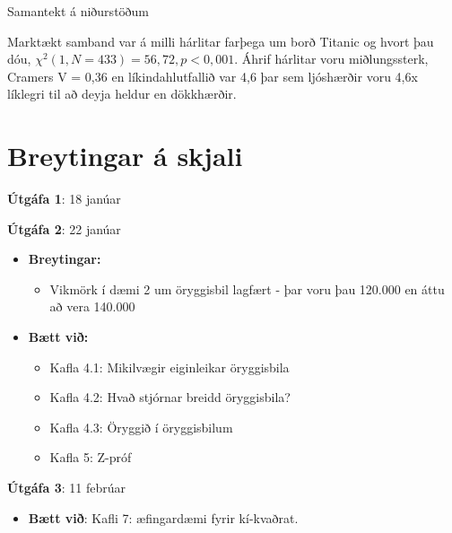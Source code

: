 \documentclass[
]{book}
\providecommand{\tightlist}{%
  \setlength{\itemsep}{0pt}\setlength{\parskip}{0pt}}
\begin{document}
Samantekt á niðurstöðum

Marktækt samband var á milli hárlitar farþega um borð Titanic og hvort þau dóu, \({\chi}^2 (1, N = 433) = 56,72, p < 0,001\). Áhrif hárlitar voru miðlungssterk, Cramer\textquotesingle s V = 0,36 en líkindahlutfallið var 4,6 þar sem ljóshærðir voru 4,6x líklegri til að deyja heldur en dökkhærðir.

\hypertarget{breytingar-uxe1-skjali}{%
\chapter{Breytingar á skjali}\label{breytingar-uxe1-skjali}}

\textbf{Útgáfa 1}: 18 janúar

\textbf{Útgáfa 2}: 22 janúar

\begin{itemize}
\item
  \textbf{Breytingar:}

  \begin{itemize}
  \tightlist
  \item
    Vikmörk í dæmi 2 um öryggisbil lagfært - þar voru þau 120.000 en áttu að vera 140.000
  \end{itemize}
\item
  \textbf{Bætt við:}

  \begin{itemize}
  \item
    Kafla 4.1: Mikilvægir eiginleikar öryggisbila
  \item
    Kafla 4.2: Hvað stjórnar breidd öryggisbila?
  \item
    Kafla 4.3: Öryggið í öryggisbilum
  \item
    Kafla 5: Z-próf
  \end{itemize}
\end{itemize}

\textbf{Útgáfa 3}: 11 febrúar

\begin{itemize}
\tightlist
\item
  \textbf{Bætt við}: Kafli 7: æfingardæmi fyrir kí-kvaðrat.
\end{itemize}

  
\end{document}
